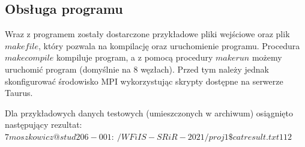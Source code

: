 \documentclass[a4paper,12pt]{article}
\begin{document}
\begin{justify}
\section{Obsługa programu}

Wraz z programem zostały dostarczone przykładowe pliki wejściowe oraz plik $makefile$, który pozwala na kompilację oraz uruchomienie programu. Procedura $make compile$ kompiluje program, a z pomocą procedury $make run$ możemy uruchomić program (domyślnie na 8 węzłach). Przed tym należy jednak skonfigurować środowisko MPI wykorzystując skrypty dostępne na serwerze Taurus.

Dla przykładowych danych testowych (umieszczonych w archiwum) osiągnięto następujący rezultat:
$
7moszkowicz@stud206-001:~/WFiIS-SRiR-2021/proj1\$ cat result.txt 
1
1
2
$

\end{justify}
\end{document}
